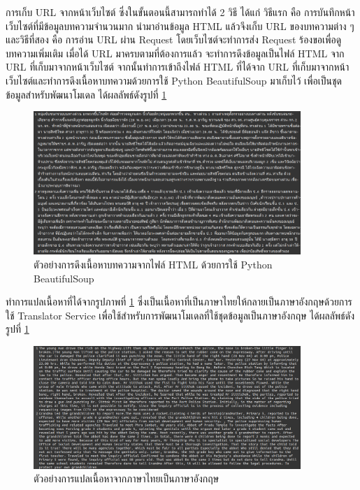 \documentclass[12pt,oneside,openright,a4paper]{cpe-thai-project}
\begin{document}
\begin{itemize}
    \hspace{1cm}การเก็บ URL จากหน้าเว็บไซต์ ซึ่งในขั้นตอนนี้สามารถทำได้ 2 วิธี ได้แก่ วิธีแรก คือ การบันทึกหน้าเว็บไซต์ที่มีข้อมูลบทความจำนวนมาก นำมาอ่านข้อมูล HTML 
    แล้วจึงเก็บ URL ของบทความต่าง ๆ และวิธีที่สอง คือ การอ่าน URL ผ่าน Request โดยเว็บไซต์จะทำการส่ง Request ร้องขอเพื่อดูบทความเพิ่มเติม 
    เมื่อได้ URL มาครบตามที่ต้องการแล้ว จะทำการดึงข้อมูลเป็นไฟล์ HTML จาก URL ที่เก็บมาจากหน้าเว็บไซต์ 
    จากนั้นทำการเข้าถึงไฟล์ HTML ที่ได้จาก URL ที่เก็บมาจากหน้าเว็บไซต์และทำการดึงเนื้อหาบทความด้วยการใช้ Python BeautifulSoup มาเก็บไว้ 
    เพื่อเป็นชุดข้อมูลสำหรับพัฒนาโมเดล ได้ผลลัพธ์ดังรูปที่ \ref{fig:data_thai}
    \begin{figure}[!ht]\centering
      \includegraphics[width=0.9\textwidth]{./img/data_col_thai.png}
      \caption{ตัวอย่างการดึงเนื้อหาบทความจากไฟล์ HTML ด้วยการใช้ Python BeautifulSoup}\label{fig:data_thai}
    \end{figure}

    \hspace{1cm}ทำการแปลเนื้อหาที่ได้จากรูปภาพที่ \ref{fig:data_thai} ซึ่งเป็นเนื้อหาที่เป็นภาษาไทยให้กลายเป็นภาษาอังกฤษด้วยการใช้ Translator Service
    เพื่อใช้สำหรับการพัฒนาโมเดลที่ใช้ชุดข้อมูลเป็นภาษาอังกฤษ ได้ผลลัพธ์ดังรูปที่ \ref{fig:data_thai}
    \begin{figure}[!ht]\centering
      \includegraphics[width=0.9\textwidth]{./img/data_col_eng.png}
      \caption{ตัวอย่างการแปลเนื้อหาจากภาษาไทยเป็นภาษาอังกฤษ}\label{fig:data_eng}
    \end{figure}
    \newpage


\end{itemize}
\end{document}
